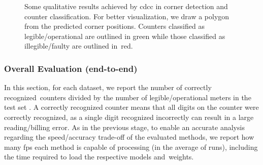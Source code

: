 \begin{figure}[!htb]
    \centering

    \vspace{0.45mm}
    

    \vspace{-1.25mm}
    
    \caption{\small Some qualitative results achieved by \gls*{cdcc} in corner detection and counter classification. For better visualization, we draw a polygon from the predicted corner positions. Counters classified as legible/operational are outlined in green while those classified as illegible/faulty are outlined in~red. 
    }
    \label{fig:results-cdcc}
\end{figure}

\subsubsection{Overall Evaluation (end-to-end)}
\label{sec:results:overall}

In this section, for each dataset, we report the number of correctly recognized~counters divided by the number of legible/operational meters in the test set .
A correctly recognized counter means that all digits on the counter were correctly recognized, as a single digit recognized incorrectly can result in a large reading/billing error.
As in the previous stage, to enable an accurate analysis regarding the speed/accuracy trade-off of the evaluated methods, we report how many \gls*{fps} each method is capable of processing (in the average of  runs), including the time required to load the respective models and~weights.

